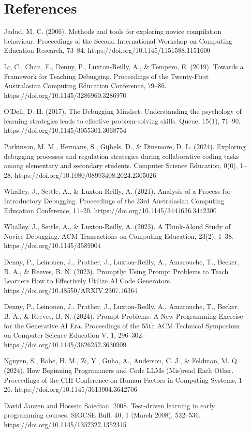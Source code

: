 \documentclass[12pt]{extarticle}
\begin{document}
\section{References}
\begin{thebibliography}{9}

Jadud, M. C. (2006). Methods and tools for exploring novice compilation behaviour. Proceedings of the Second International Workshop on Computing Education Research, 73–84. https://doi.org/10.1145/1151588.1151600

Li, C., Chan, E., Denny, P., Luxton-Reilly, A., \& Tempero, E. (2019). Towards a Framework for Teaching Debugging. Proceedings of the Twenty-First Australasian Computing Education Conference, 79–86. https://doi.org/10.1145/3286960.3286970

O’Dell, D. H. (2017). The Debugging Mindset: Understanding the psychology of learning strategies leads to effective problem-solving skills. Queue, 15(1), 71–90. https://doi.org/10.1145/3055301.3068754

Parkinson, M. M., Hermans, S., Gijbels, D., \& Dinsmore, D. L. (2024). Exploring debugging processes and regulation strategies during collaborative coding tasks among elementary and secondary students. Computer Science Education, 0(0), 1–28. https://doi.org/10.1080/08993408.2024.2305026

Whalley, J., Settle, A., \& Luxton-Reilly, A. (2021). Analysis of a Process for Introductory Debugging. Proceedings of the 23rd Australasian Computing Education Conference, 11–20. https://doi.org/10.1145/3441636.3442300

Whalley, J., Settle, A., \& Luxton-Reilly, A. (2023). A Think-Aloud Study of Novice Debugging. ACM Transactions on Computing Education, 23(2), 1–38. https://doi.org/10.1145/3589004

Denny, P., Leinonen, J., Prather, J., Luxton-Reilly, A., Amarouche, T., Becker, B. A., \& Reeves, B. N. (2023). Promptly: Using Prompt Problems to Teach Learners How to Effectively Utilize AI Code Generators. https://doi.org/10.48550/ARXIV.2307.16364

Denny, P., Leinonen, J., Prather, J., Luxton-Reilly, A., Amarouche, T., Becker, B. A., \& Reeves, B. N. (2024). Prompt Problems: A New Programming Exercise for the Generative AI Era. Proceedings of the 55th ACM Technical Symposium on Computer Science Education V. 1, 296–302. https://doi.org/10.1145/3626252.3630909

Nguyen, S., Babe, H. M., Zi, Y., Guha, A., Anderson, C. J., \& Feldman, M. Q. (2024). How Beginning Programmers and Code LLMs (Mis)read Each Other. Proceedings of the CHI Conference on Human Factors in Computing Systems, 1–26. https://doi.org/10.1145/3613904.3642706

David Janzen and Hossein Saiedian. 2008. Test-driven learning in early programming courses. SIGCSE Bull. 40, 1 (March 2008), 532–536. https://doi.org/10.1145/1352322.1352315

\end{thebibliography}
\end{document}
